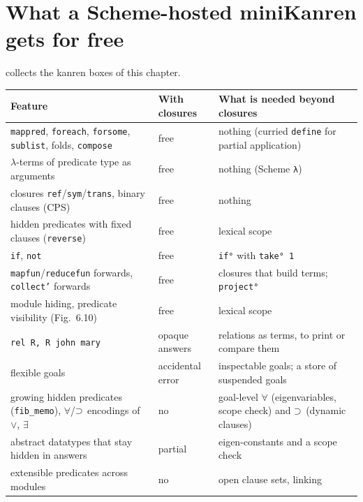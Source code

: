 \section{What a Scheme-hosted miniKanren gets for free}\label{sec:hoprog-free}

 collects the kanren boxes of this chapter.

\begin{table}[ht]
\small
\begin{tabular}{@{}>{\raggedright\arraybackslash}p{0.40\fullwidthlen}>{\raggedright\arraybackslash}p{0.17\fullwidthlen}>{\raggedright\arraybackslash}p{0.36\fullwidthlen}@{}}
\toprule
Feature & With closures & What is needed beyond closures\\
\midrule
\texttt{mappred}, \texttt{foreach}, \texttt{forsome}, \texttt{sublist}, folds, \texttt{compose} & free & nothing (curried \texttt{define} for partial application)\\
$\lambda$-terms of predicate type as arguments & free & nothing (Scheme \texttt{λ})\\
closures \texttt{ref}/\texttt{sym}/\texttt{trans}, binary clauses (CPS) & free & nothing\\
hidden predicates with fixed clauses (\texttt{reverse}) & free & lexical scope\\
\texttt{if}, \texttt{not} & free & \texttt{if°} with \texttt{take° 1}\\
\texttt{mapfun}/\texttt{reducefun} forwards, \texttt{collect'} forwards & free & closures that build terms; \texttt{project°}\\
module hiding, predicate visibility (Fig.~6.10) & free & lexical scope\\
\midrule
\texttt{rel R, R john mary} & opaque answers & relations as terms, to print or compare them\\
flexible goals & accidental error & inspectable goals; a store of suspended goals\\
growing hidden predicates (\texttt{fib\_memo}), $\forall$/$\supset$ encodings of $\vee$, $\exists$ & no & goal-level $\forall$ (eigenvariables, scope check) and $\supset$ (dynamic clauses)\\
abstract datatypes that stay hidden in answers & partial & eigen-constants and a scope check\\
extensible predicates across modules & no & open clause sets, linking\\

\end{tabular}
\end{table}
